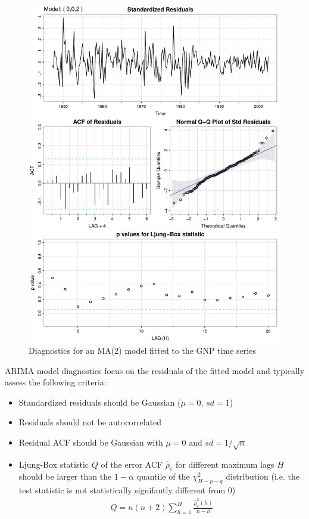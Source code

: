 \begin{figure}
\centering
\includegraphics[width=.75\textwidth]{figure25.pdf}
\caption{Diagnostics for an MA(2) model fitted to the GNP time series}
\label{fig:figure25}
\end{figure}

ARIMA model diagnostics focus on the residuals of the fitted model and typically assess the following criteria:

\begin{itemize}
   \item Standardized residuals should be Gaussian ($\mu=0$, $sd=1$)
   \item Residuals should not be autocorrelated
   \item Residual ACF should be Gaussian with $\mu=0$ and $sd=1/\sqrt{n}$
   \item Ljung-Box statistic $Q$ of the error ACF $\hat\rho_e$ for different maximum lags $H$ should be larger than the $1-\alpha$ quantile of the $\chi^2_{H-p-q}$ distribution (i.e. the test statistic is not statistically signifantly different from $0$)
   \begin{align*}
   Q = n(n+2) \sum_{h=1}^H \frac{\hat\rho_e^2(h)}{n-h}
   \end{align*}
\end{itemize}

